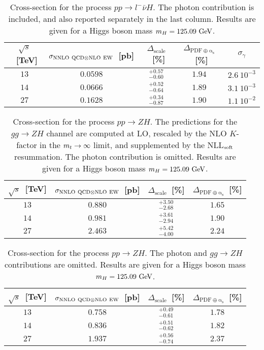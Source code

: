  \begin{table}
\centering
\begin{tabular}{cccc|c}
\toprule
$\sqrt{s}$~[TeV] & $\sigma_{{\rm NNLO~QCD}\otimes{\rm NLO~EW}}$~[pb] & $\Delta_{\mathrm{scale}}$~[\%] &
$\Delta_{\mathrm{PDF\oplus\alpha_s}}$~[\%] & $\sigma_\gamma$\\
\midrule
$13$ & $0.0598$ & $^{+0.57}_{-0.60}$ & $1.94$ & $2.6~10^{-3}$ \\
$14$ & $0.0666$ & $^{+0.52}_{-0.64}$ & $1.89$ & $3.1~10^{-3}$ \\
$27$ & $0.1628$ & $^{+0.34}_{-0.87}$ & $1.90$ & $1.1~10^{-2}$\\
\bottomrule
\end{tabular}
\caption{Cross-section for the process $p p \to l^-\bar\nu H$. 
The photon contribution is included, and also reported separately in the last column. 
Results are given for a Higgs boson mass $m_H = 125.09~{\rm GeV}$.}
\label{tab:l-nuh_xsec}
\end{table}

\begin{table}
\centering
\begin{tabular}{cccc}
\toprule
$\sqrt{s}$~[TeV] & $\sigma_{{\rm NNLO~QCD}\otimes{\rm NLO~EW}}$~[pb] & $\Delta_{\mathrm{scale}}$~[\%] &
$\Delta_{\mathrm{PDF\oplus\alpha_s}}$~[\%] \\
\midrule
$13$ & $0.880$ & $^{+3.50}_{-2.68}$ & $1.65$ \\
$14$ & $0.981$ & $^{+3.61}_{-2.94}$ & $1.90$ \\
$27$ & $2.463$ & $^{+5.42}_{-4.00}$ & $2.24$ \\
\bottomrule
\end{tabular}
\caption{Cross-section for the process $p p \to ZH$. The predictions for the $gg\to ZH$ channel are computed 
at LO, rescaled by the NLO $K$-factor in the $m_t \to \infty$ limit,
and supplemented by the NLL$_{\rm soft}$ resummation. The photon contribution is
omitted.  Results are given for a Higgs boson mass $m_H = 125.09~{\rm GeV}$.}
\label{tab:ZH_xsec}
\end{table}

\begin{table}
\centering
\begin{tabular}{cccc}
\toprule
$\sqrt{s}$~[TeV] & $\sigma_{{\rm NNLO~QCD}\otimes{\rm NLO~EW}}$~[pb] & $\Delta_{\mathrm{scale}}$~[\%] &
$\Delta_{\mathrm{PDF\oplus\alpha_s}}$~[\%] \\
\midrule
$13$ & $0.758$ & $^{+0.49}_{-0.61}$ & $1.78$ \\
$14$ & $0.836$ & $^{+0.51}_{-0.62}$ & $1.82$ \\
$27$ & $1.937$ & $^{+0.56}_{-0.74}$ & $2.37$ \\
\bottomrule
\end{tabular}
\caption{Cross-section for the process $p p \to ZH$. The photon 
and $gg\to ZH$ contributions are omitted. Results are given for a Higgs boson mass $m_H = 125.09~{\rm GeV}$.}
\label{tab:ZHnogg_xsec}
\end{table}

